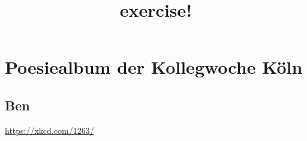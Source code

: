 \documentclass[12pt]{scrartcl}
\begin{document}
\title{exercise!}
\maketitle
\section{Poesiealbum der Kollegwoche Köln}
\subsection{Ben}
\url{https://xkcd.com/1263/}
\end{document}
